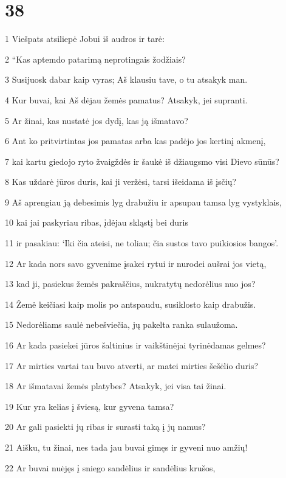 \chapter{38}


\par 1 Viešpats atsiliepė Jobui iš audros ir tarė: 
\par 2 “Kas aptemdo patarimą neprotingais žodžiais? 
\par 3 Susijuosk dabar kaip vyras; Aš klausiu tave, o tu atsakyk man. 
\par 4 Kur buvai, kai Aš dėjau žemės pamatus? Atsakyk, jei supranti. 
\par 5 Ar žinai, kas nustatė jos dydį, kas ją išmatavo? 
\par 6 Ant ko pritvirtintas jos pamatas arba kas padėjo jos kertinį akmenį, 
\par 7 kai kartu giedojo ryto žvaigždės ir šaukė iš džiaugsmo visi Dievo sūnūs? 
\par 8 Kas uždarė jūros duris, kai ji veržėsi, tarsi išeidama iš įsčių? 
\par 9 Aš aprengiau ją debesimis lyg drabužiu ir apsupau tamsa lyg vystyklais, 
\par 10 kai jai paskyriau ribas, įdėjau skląstį bei duris 
\par 11 ir pasakiau: ‘Iki čia ateisi, ne toliau; čia sustos tavo puikiosios bangos’. 
\par 12 Ar kada nors savo gyvenime įsakei rytui ir nurodei aušrai jos vietą, 
\par 13 kad ji, pasiekus žemės pakraščius, nukratytų nedorėlius nuo jos? 
\par 14 Žemė keičiasi kaip molis po antspaudu, susiklosto kaip drabužis. 
\par 15 Nedorėliams saulė nebešviečia, jų pakelta ranka sulaužoma. 
\par 16 Ar kada pasiekei jūros šaltinius ir vaikštinėjai tyrinėdamas gelmes? 
\par 17 Ar mirties vartai tau buvo atverti, ar matei mirties šešėlio duris? 
\par 18 Ar išmatavai žemės platybes? Atsakyk, jei visa tai žinai. 
\par 19 Kur yra kelias į šviesą, kur gyvena tamsa? 
\par 20 Ar gali pasiekti jų ribas ir surasti taką į jų namus? 
\par 21 Aišku, tu žinai, nes tada jau buvai gimęs ir gyveni nuo amžių! 
\par 22 Ar buvai nuėjęs į sniego sandėlius ir sandėlius krušos, 
